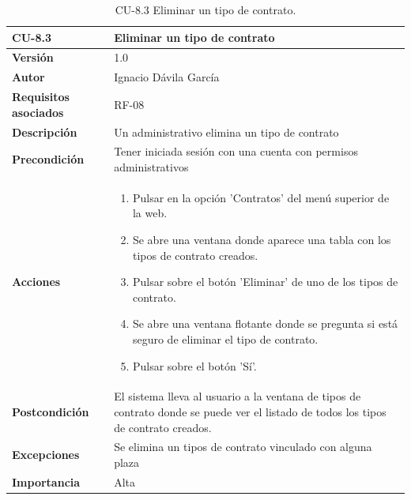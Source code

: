 \begin{table}[p]
	\centering
	\begin{tabularx}{\linewidth}{ p{} p{} }
		\toprule
		\textbf{CU-8.3}    & \textbf{Eliminar un tipo de contrato}\\
		\toprule
		\textbf{Versión}              & 1.0    \\
		\textbf{Autor}                & Ignacio Dávila García \\
		\textbf{Requisitos asociados} & RF-08 \\
		\textbf{Descripción}          & Un administrativo elimina un tipo de contrato \\
		\textbf{Precondición}         & Tener iniciada sesión con una cuenta con permisos administrativos \\
		\textbf{Acciones}             &
		\begin{enumerate}
			\def\labelenumi{\arabic{enumi}.}
			\tightlist
			\item Pulsar en la opción 'Contratos' del menú superior de la web.
			\item Se abre una ventana donde aparece una tabla con los tipos de contrato creados.
			\item Pulsar sobre el botón 'Eliminar' de uno de los tipos de contrato.
			\item Se abre una ventana flotante donde se pregunta si está seguro de eliminar el tipo de contrato.
			\item Pulsar sobre el botón 'Sí'.
		\end{enumerate}\\
		\textbf{Postcondición}        & El sistema lleva al usuario a la ventana de tipos de contrato donde se puede ver el listado de todos los tipos de contrato creados. \\
		\textbf{Excepciones}          & Se elimina un tipos de contrato vinculado con alguna plaza \\
		\textbf{Importancia}          & Alta \\
		\bottomrule
	\end{tabularx}
	\caption{CU-8.3 Eliminar un tipo de contrato.}
\end{table}

